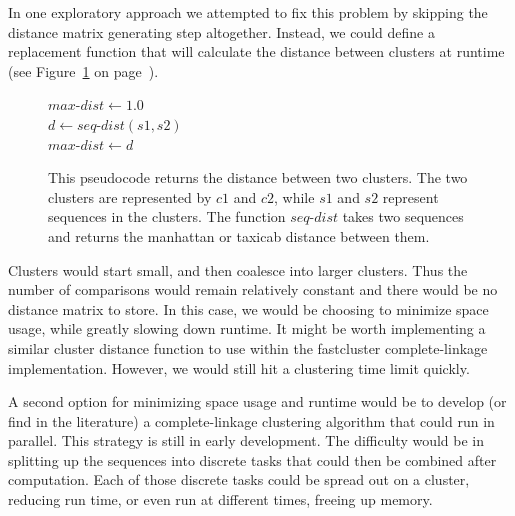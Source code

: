 In one exploratory approach we attempted to fix this problem by skipping the distance matrix generating step altogether.
Instead, we could define a replacement function that will calculate the distance between clusters at runtime (see Figure~\ref{code:LazyClustering} on page~\pageref{code:LazyClustering}).

\begin{figure}[h!]
\begin{algorithm}[H]
 \SetAlgoLined

\BlankLine
 $max$-$dist \gets 1.0$\\
  {
    {
    $d \gets seq$-$dist(s1, s2)$\\
     {
      $max$-$dist \gets d$
    }
   }
 }
\end{algorithm}
\caption[Pseudocode showing a distance function for two clusters.]{This pseudocode returns the distance between two clusters. The two clusters are represented by $c1$ and $c2$, while $s1$ and $s2$ represent sequences in the clusters. The function $seq$-$dist$ takes two sequences and returns the manhattan or taxicab distance between them.}
\label{code:LazyClustering}
\end{figure}

Clusters would start small, and then coalesce into larger clusters.
Thus the number of comparisons would remain relatively constant and there would be no distance matrix to store.
In this case, we would be choosing to minimize space usage, while greatly slowing down runtime.
It might be worth implementing a similar cluster distance function to use within the fastcluster complete-linkage implementation.
However, we would still hit a clustering time limit quickly.

A second option for minimizing space usage and runtime would be to develop (or find in the literature) a complete-linkage clustering algorithm that could run in parallel.
This strategy is still in early development.
The difficulty would be in splitting up the sequences into discrete tasks that could then be combined after computation.
Each of those discrete tasks could be spread out on a cluster, reducing run time, or even run at different times, freeing up memory.

